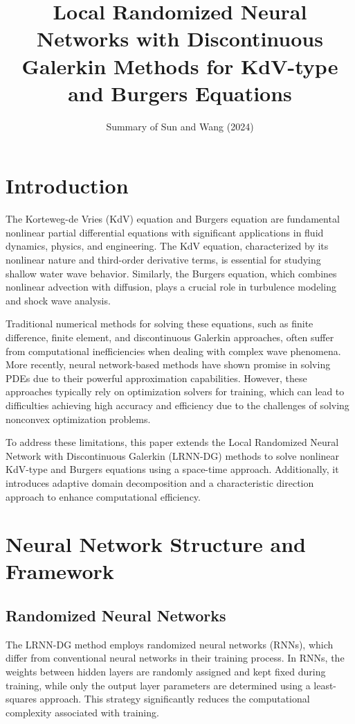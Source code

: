 \documentclass[11pt,a4paper]{article}
\title{Local Randomized Neural Networks with Discontinuous Galerkin Methods for KdV-type and Burgers Equations}
\author{Summary of Sun and Wang (2024)}
\date{}
\begin{document}
\maketitle

\section{Introduction}

The Korteweg-de Vries (KdV) equation and Burgers equation are fundamental nonlinear partial differential equations with significant applications in fluid dynamics, physics, and engineering. The KdV equation, characterized by its nonlinear nature and third-order derivative terms, is essential for studying shallow water wave behavior. Similarly, the Burgers equation, which combines nonlinear advection with diffusion, plays a crucial role in turbulence modeling and shock wave analysis.

Traditional numerical methods for solving these equations, such as finite difference, finite element, and discontinuous Galerkin approaches, often suffer from computational inefficiencies when dealing with complex wave phenomena. More recently, neural network-based methods have shown promise in solving PDEs due to their powerful approximation capabilities. However, these approaches typically rely on optimization solvers for training, which can lead to difficulties achieving high accuracy and efficiency due to the challenges of solving nonconvex optimization problems.

To address these limitations, this paper extends the Local Randomized Neural Network with Discontinuous Galerkin (LRNN-DG) methods to solve nonlinear KdV-type and Burgers equations using a space-time approach. Additionally, it introduces adaptive domain decomposition and a characteristic direction approach to enhance computational efficiency.

\section{Neural Network Structure and Framework}

\subsection{Randomized Neural Networks}

The LRNN-DG method employs randomized neural networks (RNNs), which differ from conventional neural networks in their training process. In RNNs, the weights between hidden layers are randomly assigned and kept fixed during training, while only the output layer parameters are determined using a least-squares approach. This strategy significantly reduces the computational complexity associated with training.
\end{document}
